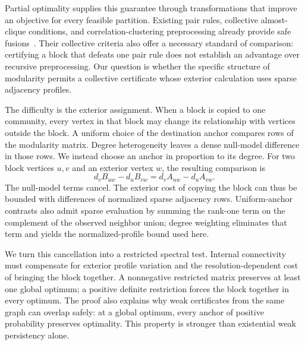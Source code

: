 \documentclass[sigconf,anonymous,review]{acmart}
\newcommand{\1}{\mathbf{1}}
\begin{document}
Partial optimality supplies this guarantee through transformations that improve
an objective for every feasible partition. Existing pair rules, collective
almost-clique conditions, and correlation-clustering preprocessing already
provide safe fusions~\cite{lange2018partial,lange2019combinatorial,bocker2011exact,blasius2022branch}. Their collective criteria also offer a necessary standard
of comparison: certifying a block that defeats one pair rule does not establish
an advantage over recursive preprocessing. Our question is whether the specific
structure of modularity permits a collective certificate whose exterior
calculation uses sparse adjacency profiles.

The difficulty is the exterior assignment. When a block is copied to one
community, every vertex in that block may change its relationship with vertices
outside the block. A uniform choice of the destination anchor compares rows of
the modularity matrix. Degree heterogeneity leaves a dense null-model difference
in those rows. We instead choose an anchor in proportion to its degree. For two
block vertices $u,v$ and an exterior vertex $w$, the resulting comparison is
\begin{equation}
 d_v B_{uw}-d_u B_{vw}=d_v A_{uw}-d_u A_{vw}.
 \label{eq:insight}
\end{equation}
The null-model terms cancel. The exterior cost of copying the block can thus be
bounded with differences of normalized sparse adjacency rows. Uniform-anchor
contrasts also admit sparse evaluation by summing the rank-one term on the
complement of the observed neighbor union; degree weighting eliminates that
term and yields the normalized-profile bound used here.

We turn this cancellation into a restricted spectral test. Internal connectivity
must compensate for exterior profile variation and the resolution-dependent
cost of bringing the block together. A nonnegative restricted matrix preserves
at least one global optimum; a positive definite restriction forces the block
together in every optimum. The proof also explains why weak certificates from
the same graph can overlap safely: at a global optimum, every anchor of positive
probability preserves optimality. This property is stronger than existential
weak persistency alone.
\end{document}
